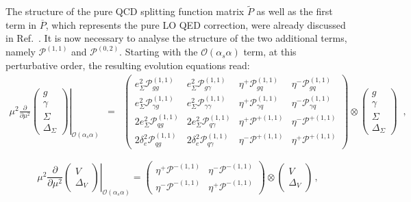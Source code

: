 The structure of the pure QCD splitting function matrix
$\widetilde{P}$ as well as the first term in $\overline{P}$, which
represents the pure LO QED correction, were already discussed in
Ref.~\cite{Bertone:2015lqa}.
%
It is now necessary to analyse the structure of the two additional
terms, namely $\mathcal{P}^{(1,1)}$ and $\mathcal{P}^{(0,2)}$.
%
Starting with the $\mathcal{O}(\alpha_s\alpha)$ term,
%
at this perturbative order, the resulting evolution equations read:
\begin{equation}
\begin{array}{rcl}
\displaystyle\left.\mu^2\frac{\partial}{\partial \mu^2}
\begin{pmatrix}
g\\
\gamma\\
\Sigma\\
\Delta_\Sigma
\end{pmatrix}
\right|_{\mathcal{O}(\alpha_s \alpha)} &=& \displaystyle \begin{pmatrix}
e_\Sigma^2 \mathcal{P}^{(1,1)}_{gg}      & e_\Sigma^2 \mathcal{P}^{(1,1)}_{g\gamma} & \eta^+\mathcal{P}^{(1,1)}_{gq} & \eta^-\mathcal{P}^{(1,1)}_{gq} \\
e_\Sigma^2 \mathcal{P}^{(1,1)}_{\gamma g} & e_\Sigma^2 \mathcal{P}^{(1,1)}_{\gamma\gamma} & \eta^+\mathcal{P}^{(1,1)}_{\gamma q} &\eta^-\mathcal{P}^{(1,1)}_{\gamma q} \\
2 e_\Sigma^2 \mathcal{P}^{(1,1)}_{qg}    & 2 e_\Sigma^2 \mathcal{P}^{(1,1)}_{q\gamma} & \eta^+\mathcal{P}^{+(1,1)}  & \eta^-\mathcal{P}^{+(1,1)}\\
2 \delta_e^2 \mathcal{P}^{(1,1)}_{qg} & 2 \delta_e^2 \mathcal{P}^{(1,1)}_{q\gamma} &\eta^-\mathcal{P}^{+(1,1)} &\eta^+\mathcal{P}^{+(1,1)}
\end{pmatrix}\otimes
\begin{pmatrix}
g\\
\gamma\\
\Sigma\\
\Delta_\Sigma
\end{pmatrix}
\end{array}\,,
\end{equation}

\begin{equation}
\displaystyle\left.\mu^2\frac{\partial}{\partial \mu^2}
\begin{pmatrix}
V\\
\Delta_V
\end{pmatrix} \right|_{\mathcal{O}(\alpha_s \alpha)}= 
\begin{pmatrix}
\eta^+\mathcal{P}^{-(1,1)} & \eta^-\mathcal{P}^{-(1,1)} \\
\eta^-\mathcal{P}^{-(1,1)} & \eta^+\mathcal{P}^{-(1,1)} 
\end{pmatrix}\otimes
\begin{pmatrix}
V\\
\Delta_V
\end{pmatrix}\,,
\end{equation}

